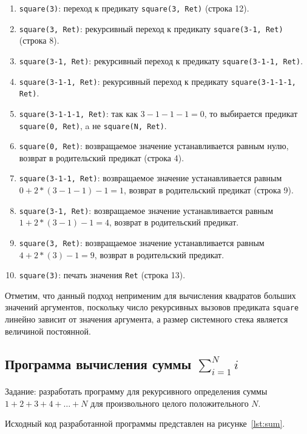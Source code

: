 \begin{enumerate}
\item \texttt{square(3)}:
  переход к предикату \texttt{square(3, Ret)} (строка 12). 
\item \texttt{square(3, Ret)}: 
  рекурсивный переход к предикату \texttt{square(3-1, Ret)} (строка 8).
\item \texttt{square(3-1, Ret)}: 
  рекурсивный переход к предикату \texttt{square(3-1-1, Ret)}.
\item \texttt{square(3-1-1, Ret)}:
  рекурсивный переход к предикату \texttt{square(3-1-1-1, Ret)}.
\item \texttt{square(3-1-1-1, Ret)}:
  так как \( 3 - 1 - 1 - 1 = 0 \), 
  то выбирается предикат \texttt{square(0, Ret)}, a не \texttt{square(N, Ret)}.
\item \texttt{square(0, Ret)}:
  возвращаемое значение устанавливается равным нулю,
  возврат в родительский предикат (строка 4).
\item \texttt{square(3-1-1, Ret)}:
  возвращаемое значение устанавливается равным \( 0 + 2*(3-1-1) - 1 = 1 \),
  возврат в родительский предикат (строка 9).
\item \texttt{square(3-1, Ret)}:
  возвращаемое значение устанавливается равным \( 1 + 2*(3-1) - 1 = 4 \),
  возврат в родительский предикат.
\item \texttt{square(3, Ret)}: 
  возвращаемое значение устанавливается равным \( 4 + 2*(3) - 1 = 9 \),
  возврат в родительский предикат.
\item \texttt{square(3)}: 
  печать значения \texttt{Ret} (строка 13).
\end{enumerate}

Отметим, что данный подход неприменим для вычисления квадратов
больших значений аргументов, поскольку число рекурсивных вызовов 
предиката \texttt{square} линейно зависит от значения аргумента,
а размер системного стека является величиной постоянной.

\pagebreak
\subsection{Программа вычисления суммы  \( \sum_{i=1}^N i \)}

Задание: разработать программу для рекурсивного определения суммы
\( 1 + 2 + 3 + 4 + \dots + N \) для произвольного 
целого положительного \( N \).

Исходный код разработанной программы представлен на
рисунке~\ref{lst:sum}.

